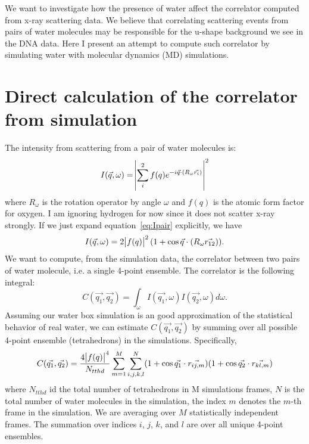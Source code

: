 \documentclass[20pt]{article}
\begin{document}
We want to investigate how the presence of water affect the correlator computed from x-ray scattering data. We believe that correlating scattering events from pairs of water molecules may be responsible for the u-shape background we see in the DNA data. Here I present an attempt to compute such correlator by simulating water with molecular dynamics (MD) simulations.

\section{Direct calculation of the correlator from simulation}
The intensity from scattering from a pair of water molecules is:
\begin{equation} \label{eq:Ipair}
I(\vec{q},\omega) = \abs{\sum_{i}^{2} f(q) e^{-i \vec{q} \cdot (R_{\omega} \vec{r_i})}}^2
\end{equation}
where $R_{\omega}$ is the rotation operator by angle $\omega$ and $f(q)$ is the atomic form factor for oxygen. I am ignoring hydrogen for now since it does not scatter x-ray strongly. If we just expand equation~\ref{eq:Ipair} explicitly, we have
\begin{equation} \label{eq:Ipair_exp}
I(\vec{q},\omega) = 2\abs{f(q)}^2 (1+\cos{\vec{q} \cdot (R_{\omega} \vec{r_{12}})} ).
\end{equation}
We want to compute, from the simulation data, the correlator between two pairs of water molecule, i.e. a single 4-point ensemble. The correlator is the following integral:
\begin{equation} \label{eq:corr}
C(\vec{q_1}, \vec{q_2}) = \int_{\omega} I(\vec{q_1},\omega) I(\vec{q_2},\omega) d\omega.
\end{equation}
Assuming our water box simulation is an good approximation of the statistical behavior of real water, we can estimate $C(\vec{q_1}, \vec{q_2})$ by summing over all possible 4-point ensemble (tetrahedrons) in the simulations. Specifically,
\begin{equation} \label{eq:est_corr}
C(\vec{q_1}, \vec{q_2})  = \frac{ 4 \abs{f(q)}^4 }{N_{tthd}} \sum_{m=1}^{M} \sum^{N}_{i,j,k,l}  (1+\cos{\vec{q_1} \cdot \vec{r_{ij,m}}} ) (1+\cos{\vec{q_2} \cdot \vec{r_{kl,m}}} )
\end{equation}
where $N_{tthd}$ id the total number of tetrahedrons in M simulations frames, $N$ is the total number of water molecules in the simulation, the index $m$ denotes the $m$-th frame in the simulation. We are averaging over $M$ statistically independent frames. The summation over indices $i$, $j$, $k$, and $l$ are over all unique 4-point ensembles.
\end{document}
